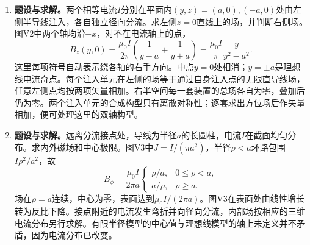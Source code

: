 \documentclass[UTF8,fontset=fandol,a4paper,11pt]{ctexart}
\newcommand{\figcaption}[1]{\par\vspace{2pt}{\small\color{muted}#1}\par}
\begin{document}
\begin{enumerate}
\item \textbf{题设与求解。}两个相等电流$I$分别在平面内$(y,z)=(a,0),(-a,0)$处由左侧半导线注入，各自独立径向分流。求左侧$z=0$直线上的场，并判断右侧场。图V2中两个轴均沿$+x$，对不在电流轴上的点，
\[B_z(y,0)=\frac{\mu_0I}{2\pi}\left(\frac1{y-a}+\frac1{y+a}\right)
=\frac{\mu_0I}{\pi}\frac{y}{y^2-a^2}.\]
这里每项符号自动表示绕各轴的右手方向。中点$y=0$处相消；$y=\pm a$是理想线电流奇点。每个注入单元在左侧的场等于通过自身注入点的无限直导线场，任意左侧点均按两项矢量相加。右半空间每一套装置的总场各自为零，叠加后仍为零。两个注入单元的合成构型只有离散对称性；逐套求出方位场后作矢量相加，便可处理这里的双轴构型。
\begin{center}\begin{minipage}{.98\linewidth}\centering
{}
\figcaption{变图电试1.2V2}
\end{minipage}\end{center}

\item \textbf{题设与求解。}远离分流接点处，导线为半径$a$的长圆柱，电流$I$在截面均匀分布。求内外磁场和中心极限。图V3中$J=I/(\pi a^2)$，半径$\rho<a$环路包围$I\rho^2/a^2$，故
\[B_\phi=\frac{\mu_0I}{2\pi a}
\begin{cases}\rho/a,&0\le\rho<a,\\a/\rho,&\rho\ge a.\end{cases}\]
场在$\rho=a$连续，中心为零，表面达到$\mu_0I/(2\pi a)$。图V3在表面处由线性增长转为反比下降。接点附近的电流发生弯折并向径向分流，内部场按相应的三维电流分布另行求解。有限半径模型的中心值与理想线模型的轴上未定义并不矛盾，因为电流分布已改变。
\begin{center}\begin{minipage}{.98\linewidth}\centering
{}
\figcaption{变图电试1.2V3}
\end{minipage}\end{center}


\end{enumerate}
\end{document}
